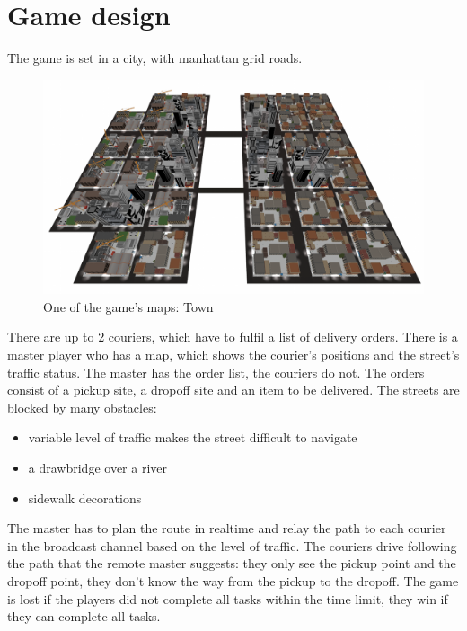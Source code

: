 \documentclass[12pt]{article}
\begin{document}
\vfill
{}

\clearpage

\section{Game design}
The game is set in a city, with manhattan grid roads.
\begin{figure}[H]
\includegraphics[width=\textwidth]{map_town}
\caption{One of the game's maps: Town}
\end{figure}
There are up to 2 couriers, which have to fulfil a list of delivery orders.
There is a master player who has a map, which shows the courier's positions and the street's traffic status. The master has the order list, the couriers do not.
The orders consist of a pickup site, a dropoff site and an item to be delivered.
The streets are blocked by many obstacles:
\begin{itemize}
  \item variable level of traffic makes the street difficult to navigate
  \item a drawbridge over a river
  \item sidewalk decorations
\end{itemize}
The master has to plan the route in realtime and relay the path to each courier in the broadcast channel based on the level of traffic.
The couriers drive following the path that the remote master suggests: they only see the pickup point and the dropoff point, they don't know the way from the pickup to the dropoff.
The game is lost if the players did not complete all tasks within the time limit, they win if they can complete all tasks.
\end{document}
